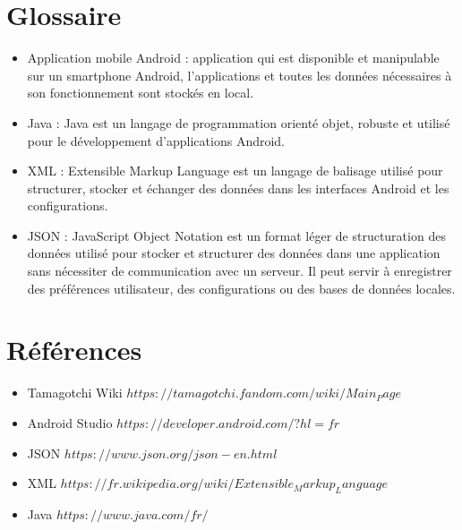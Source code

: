 \documentclass{cahier_des_charges}
\begin{document}
\section{Glossaire} \label{sec:glossaire}
\begin{itemize}[label=\textbullet]
\item Application mobile Android : application qui est disponible et manipulable sur un smartphone Android, l’applications et toutes les données nécessaires à son fonctionnement sont stockés en local.
\item Java : Java est un langage de programmation orienté objet, robuste et utilisé pour le développement d'applications Android.
\item XML : Extensible Markup Language est un langage de balisage utilisé pour structurer, stocker et échanger des données dans les interfaces Android et les configurations.
\item JSON : JavaScript Object Notation est un format léger de structuration des données utilisé pour stocker et structurer des données dans une application sans nécessiter de communication avec un serveur. Il peut servir à enregistrer des préférences utilisateur, des configurations ou des bases de données locales.
\end{itemize}

\section{Références}
\begin{itemize}[label=\textbullet]
\item Tamagotchi Wiki \href{https://tamagotchi.fandom.com/wiki/Main_Page}{$https://tamagotchi.fandom.com/wiki/Main_Page$}
\item Android Studio \href{https://developer.android.com/?hl=fr}{$https://developer.android.com/?hl=fr$}
\item JSON \href{https://www.json.org/json-en.html}{$https://www.json.org/json-en.html$}
\item XML \href{https://fr.wikipedia.org/wiki/Extensible_Markup_Language}{$https://fr.wikipedia.org/wiki/Extensible_Markup_Language$}
\item Java \href{https://www.java.com/fr/}{$https://www.java.com/fr/$}
\end{itemize}
\end{document}
